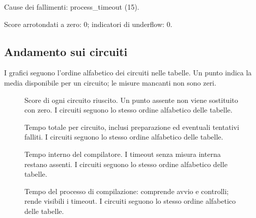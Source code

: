 Cause dei fallimenti: process\_timeout (15).

Score arrotondati a zero: 0; indicatori di underflow: 0.
\subsection{Andamento sui circuiti}
I grafici seguono l’ordine alfabetico dei circuiti nelle tabelle. Un punto indica la media disponibile per un circuito; le misure mancanti non sono zeri.

\begin{figure}[!htbp]\centering

\caption{Score di ogni circuito riuscito. Un punto assente non viene sostituito con zero. I circuiti seguono lo stesso ordine alfabetico delle tabelle.}
\end{figure}

\begin{figure}[!htbp]\centering

\caption{Tempo totale per circuito, inclusi preparazione ed eventuali tentativi falliti. I circuiti seguono lo stesso ordine alfabetico delle tabelle.}
\end{figure}

\begin{figure}[!htbp]\centering

\caption{Tempo interno del compilatore. I timeout senza misura interna restano assenti. I circuiti seguono lo stesso ordine alfabetico delle tabelle.}
\end{figure}

\begin{figure}[!htbp]\centering

\caption{Tempo del processo di compilazione: comprende avvio e controlli; rende visibili i timeout. I circuiti seguono lo stesso ordine alfabetico delle tabelle.}
\end{figure}
\FloatBarrier\clearpage
